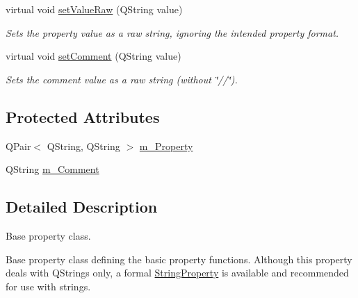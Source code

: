 \begin{DoxyCompactItemize}
virtual void \hyperlink{class_base_property_adf0d7a0e824a9d058387336d91514539}{set\-Value\-Raw} (Q\-String value)
\begin{DoxyCompactList}\small\item\em Sets the property value as a raw string, ignoring the intended property format. \end{DoxyCompactList}\item 
virtual void \hyperlink{class_base_property_ac882e4b94451ae00ab78d79afde84de5}{set\-Comment} (Q\-String value)
\begin{DoxyCompactList}\small\item\em Sets the comment value as a raw string (without \char`\"{}//\char`\"{}). \end{DoxyCompactList}\end{DoxyCompactItemize}
\subsection*{Protected Attributes}
\begin{DoxyCompactItemize}
\item 
Q\-Pair$<$ Q\-String, Q\-String $>$ \hyperlink{class_base_property_a2338fecdc198936259809444e93e93df}{m\-\_\-\-Property}
\item 
Q\-String \hyperlink{class_base_property_a2a08935cf352cb274575be32188e8acd}{m\-\_\-\-Comment}
\end{DoxyCompactItemize}


\subsection{Detailed Description}
Base property class. 

Base property class defining the basic property functions. Although this property deals with Q\-Strings only, a formal \hyperlink{class_string_property}{String\-Property} is available and recommended for use with strings. 

